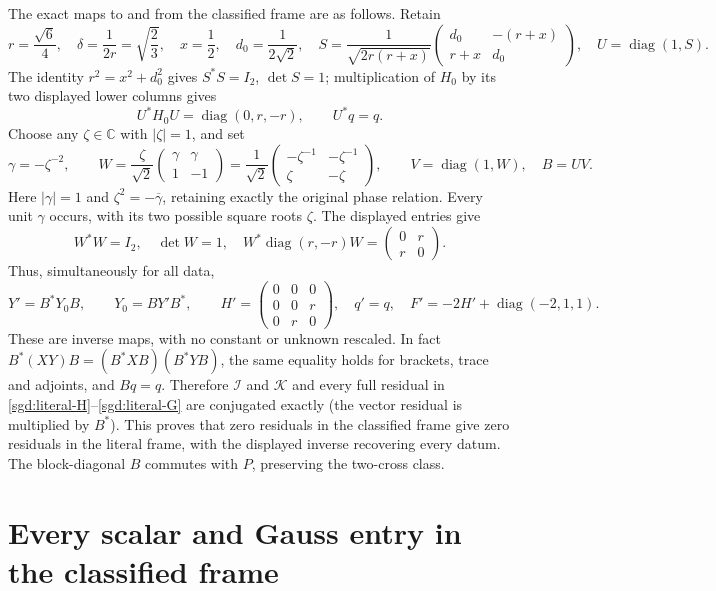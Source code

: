 \documentclass[11pt]{article}
\newcommand{\diag}{\operatorname{diag}}
\begin{document}
The exact maps to and from the classified frame are as follows. Retain
\[
 r=\frac{\sqrt6}{4},\quad \delta=\frac1{2r}=\sqrt{\frac23},\quad
 x=\frac12,\quad d_0=\frac1{2\sqrt2},\quad
 S=\frac1{\sqrt{2r(r+x)}}
       \begin{pmatrix}d_0&-(r+x)\\r+x&d_0\end{pmatrix},\quad
 U=\diag(1,S).
\]
The identity $r^2=x^2+d_0^2$ gives $S^*S=I_2$, $\det S=1$;
multiplication of $H_0$ by its two displayed lower columns gives
\[
 U^*H_0U=\diag(0,r,-r),\qquad U^*q=q.
\]
Choose any $\zeta\in\mathbb C$ with $|\zeta|=1$, and set
\[
 \gamma=-\zeta^{-2},\qquad
 W=\frac\zeta{\sqrt2}\begin{pmatrix}\gamma&\gamma\\1&-1\end{pmatrix}
  =\frac1{\sqrt2}\begin{pmatrix}-\zeta^{-1}&-\zeta^{-1}\\
                         \zeta&-\zeta\end{pmatrix},\qquad
 V=\diag(1,W),\quad B=UV.
\]
Here $|\gamma|=1$ and $\zeta^2=-\overline\gamma$, retaining exactly
the original phase relation. Every unit $\gamma$ occurs, with its two
possible square roots $\zeta$. The displayed entries give
\[
 W^*W=I_2,\quad \det W=1,\quad
 W^*\diag(r,-r)W=\begin{pmatrix}0&r\\r&0\end{pmatrix}.
\]
Thus, simultaneously for all data,
\begin{equation}
 Y'=B^*Y_0B,\qquad Y_0=BY'B^*,\qquad
 H'=\begin{pmatrix}0&0&0\\0&0&r\\0&r&0\end{pmatrix},\quad
 q'=q,\quad F'=-2H'+\diag(-2,1,1).
 \label{sgd:frame}
\end{equation}
These are inverse maps, with no constant or unknown rescaled. In fact
$B^*(XY)B=(B^*XB)(B^*YB)$, the same equality holds for brackets,
trace and adjoints, and $Bq=q$. Therefore $\mathcal I$ and $\mathcal K$
and every full residual in \eqref{sgd:literal-H}--\eqref{sgd:literal-G}
are conjugated exactly (the vector residual is multiplied by $B^*$).
This proves that zero residuals in the classified frame give zero residuals
in the literal frame, with the displayed inverse recovering every datum.
The block-diagonal $B$ commutes with $P$, preserving the two-cross class.

\section{Every scalar and Gauss entry in the classified frame}
\end{document}
